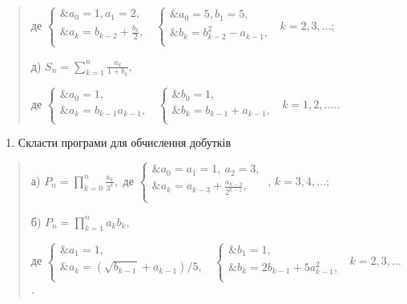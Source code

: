 \documentclass[]{article}
\begin{document}
\begin{quote}
де \(\left\{ \begin{matrix}
\& a_{0} = 1,a_{1} = 2, \\
\& a_{k} = b_{k - 2} + \frac{b_{k}}{2}, \\
\end{matrix} \right.\ \) \(\left\{ \begin{matrix}
\& a_{0} = 5,b_{1} = 5, \\
\& b_{k} = b_{k - 2}^{2} - a_{k - 1}, \\
\end{matrix} \right.\ \) \(k = 2,3,\ldots;\)

д) \(S_{n} = \sum_{k = 1}^{n}\frac{a_{k}}{1 + b_{k}},\)

де \(\left\{ \begin{matrix}
\& a_{0} = 1, \\
\& a_{k} = b_{k - 1}a_{k - 1}, \\
\end{matrix} \right.\ \) \(\left\{ \begin{matrix}
\& b_{0} = 1, \\
\& b_{k} = b_{k - 1} + a_{k - 1}, \\
\end{matrix} \right.\ \) \(k = 1,2,\ldots.\)\emph{.}
\end{quote}

\begin{enumerate}
\def\labelenumi{\arabic{enumi})}
\item
  Скласти програми для обчислення добутків
\end{enumerate}

\begin{quote}
а) \(P_{n} = \prod_{k = 0}^{n}{\frac{a_{k}}{3^{k}},}\) де
\(\left\{ \begin{matrix}
\& a_{0} = a_{1} = 1,\ a_{2} = 3, \\
\& a_{k} = a_{k - 3} + \frac{a_{k - 2}}{2^{k - 1}}, \\
\end{matrix} \right.\ \), \(k = 3,4,\ldots;\)

б) \(P_{n} = \prod_{k = 1}^{n}{a_{k}b_{k},}\)

де \(\left\{ \begin{matrix}
\& a_{1} = 1, \\
\& a_{k} = \left( \sqrt{b_{k - 1}} + a_{k - 1} \right)/5, \\
\end{matrix} \right.\ \) \(\left\{ \begin{matrix}
\& b_{1} = 1, \\
\& b_{k} = 2b_{k - 1} + 5a_{k - 1}^{2}, \\
\end{matrix} \right.\ \) \(k = 2,3,\ldots\)\emph{.}
\end{quote}
\end{document}
